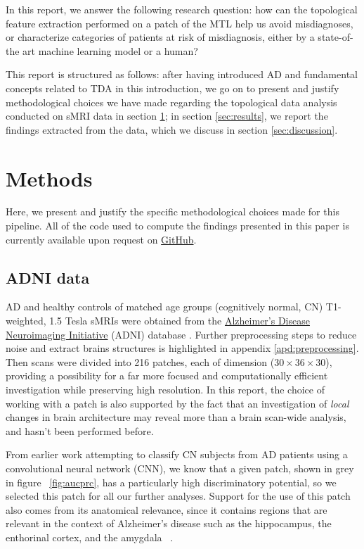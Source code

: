 \documentclass{article}
\begin{document}
In this report, we answer the following research question:
how can the topological feature extraction performed on a patch of the MTL help us avoid misdiagnoses, or characterize categories of patients at risk of misdiagnosis, either by a state-of-the art machine learning model or a human?

This report is structured as follows: after having introduced AD and fundamental concepts related to TDA in this introduction, we go on to present and justify methodological choices we have made regarding the topological data analysis conducted on sMRI data in section \ref{sec:methods}; in section \ref{sec:results}, we report the findings extracted from the data, which we discuss in section \ref{sec:discussion}.

\section{Methods}\label{sec:methods}

Here, we present and justify the specific methodological choices made for this pipeline. All of the code used to compute the findings presented in this paper is currently available upon request on \href{https://github.com/pjhartout/TDA_ADNI_MLCB}{GitHub}.

\subsection{ADNI data}

AD and healthy controls of matched age groups (cognitively normal, CN) T1-weighted, 1.5 Tesla sMRIs were obtained from the \href{adni.loni.usc.edu}{Alzheimer's Disease Neuroimaging Initiative} (ADNI) database \citep{jack2008alzheimer}. Further preprocessing steps to reduce noise and extract brains structures is highlighted in appendix \ref{apd:preprocessing}. Then scans were divided into 216 patches, each of dimension ($30\times36\times30$), providing a possibility for a far more focused and computationally efficient investigation while preserving high resolution. In this report, the choice of working with a patch is also supported by the fact that an investigation of \emph{local} changes in brain architecture may reveal more than a brain scan-wide analysis, and hasn't been performed before.

From earlier work attempting to classify CN subjects from AD patients using a convolutional neural network (CNN), we know that a given patch, shown in grey in figure ~\ref{fig:aucprc}, has a particularly high discriminatory potential, so we selected this patch for all our further analyses. Support for the use of this patch also comes from its anatomical relevance, since it contains regions that are relevant in the context of Alzheimer's disease such as the hippocampus, the enthorinal cortex, and the amygdala ~\citep{goedert2006century}.
\end{document}
